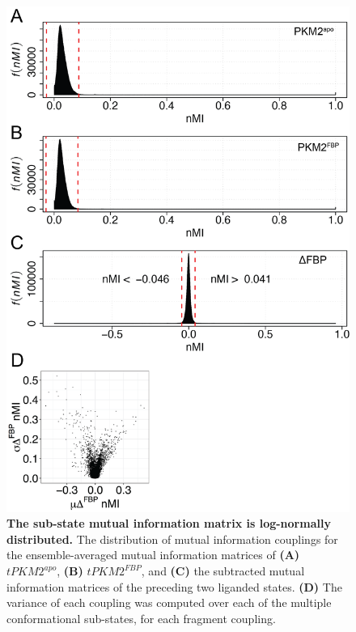 \begin{figure}[!ht]
\includegraphics[scale=0.7]{ch6_fig12_MI_stats.png}
\caption[The sub-state mutual information matrix is log-normally distributed.]{\textbf{The sub-state mutual information matrix is log-normally distributed.} The distribution of mutual information couplings for the ensemble-averaged mutual information matrices of \textbf{(A)} $tPKM2^{apo}$, \textbf{(B)} $tPKM2^{FBP}$, and \textbf{(C) }the subtracted mutual information matrices of the preceding two liganded states. \textbf{(D)} The variance of each coupling was computed over each of the multiple conformational sub-states, for each fragment coupling.}
\label{fig:mi_stats}
\end{figure}
%
%
\clearpage


